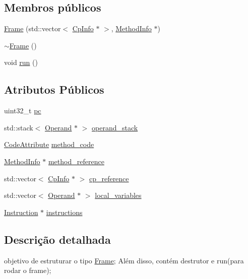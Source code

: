 \subsection*{Membros públicos}
\begin{DoxyCompactItemize}
\item 
\hyperlink{struct_frame_abe0b370087d05267cab997ecdc78c4bd}{Frame} (std\+::vector$<$ \hyperlink{class_cp_info}{Cp\+Info} $\ast$ $>$, \hyperlink{struct_method_info}{Method\+Info} $\ast$)
\item 
\hyperlink{struct_frame_abec8c7bccdfc88cb4da137caae9f73d6}{$\sim$\+Frame} ()
\item 
void \hyperlink{struct_frame_a9aa2ef354e013a7cb95827c55a3b3a95}{run} ()
\end{DoxyCompactItemize}
\subsection*{Atributos Públicos}
\begin{DoxyCompactItemize}
\item 
uint32\+\_\+t \hyperlink{struct_frame_a91e50d2091184efb52b6d7c0c21fd4b2}{pc}
\item 
std\+::stack$<$ \hyperlink{struct_operand}{Operand} $\ast$ $>$ \hyperlink{struct_frame_a30eaf6634fbadf9dd4c6a8c05b92d3a4}{operand\+\_\+stack}
\item 
\hyperlink{class_code_attribute}{Code\+Attribute} \hyperlink{struct_frame_a7eac6c489fcfc2de43409f405d360a3d}{method\+\_\+code}
\item 
\hyperlink{struct_method_info}{Method\+Info} $\ast$ \hyperlink{struct_frame_ad7c3164833be265d690a786a172ca80a}{method\+\_\+reference}
\item 
std\+::vector$<$ \hyperlink{class_cp_info}{Cp\+Info} $\ast$ $>$ \hyperlink{struct_frame_af1f36df4b5e662589ccf18d253318060}{cp\+\_\+reference}
\item 
std\+::vector$<$ \hyperlink{struct_operand}{Operand} $\ast$ $>$ \hyperlink{struct_frame_aed517b3bbbefabb20d8e990623ac3118}{local\+\_\+variables}
\item 
\hyperlink{class_instruction}{Instruction} $\ast$ \hyperlink{struct_frame_a831ef5a24bea9ba519495aa41e2f2a7e}{instructions}
\end{DoxyCompactItemize}


\subsection{Descrição detalhada}
objetivo de estruturar o tipo \hyperlink{struct_frame}{Frame}; Além disso, contém destrutor e run(para rodar o frame); 

